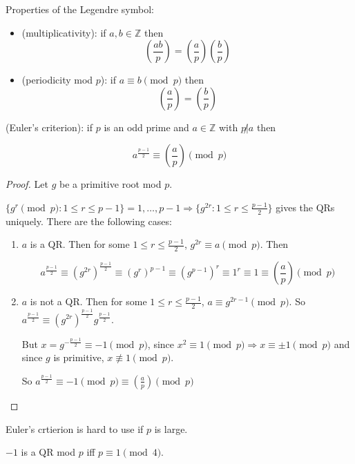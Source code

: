 Properties of the Legendre symbol:
\begin{itemize}
	\item (multiplicativity): if $a, b \in \mathbb{Z}$ then
	\[(\frac{ab}{p}) = (\frac{a}{p})(\frac{b}{p})\]
	\item (periodicity mod $p$): if $a \equiv b \pmod{p}$ then
	\[(\frac{a}{p}) = (\frac{b}{p})\]
\end{itemize}

\begin{theorem}
	(Euler's criterion): if $p$ is an odd prime and $a \in \mathbb{Z}$ with $p \not | a$ then

	\[a^{\frac{p - 1}{2}} \equiv (\frac{a}{p}) \pmod{p}\]
\end{theorem}

\begin{proof}
	Let $g$ be a primitive root mod $p$.
	
	$\{g^r \pmod{p}: 1 \le r \le p - 1\} = {1, \dots, p - 1} \Rightarrow \{g^{2r}: 1 \le r \le \frac{p - 1}{2}\}$ gives the QRs uniquely. There are the following cases:

	\begin{enumerate}
		\item $a$ is a QR. Then for some $1 \le r \le \frac{p - 1}{2}$, $g^{2r} \equiv a \pmod{p}$. Then
		
		\[a^{\frac{p - 1}{2}} \equiv (g^{2r})^{\frac{p - 1}{2}} \equiv (g^r)^{p - 1} \equiv (g^{p - 1})^r \equiv 1^r \equiv 1 \equiv (\frac{a}{p}) \pmod{p}\]
		\item $a$ is not a QR. Then for some $1 \le r \le \frac{p - 1}{2}$, $a \equiv g^{2r - 1} \pmod{p}$. So $a^{\frac{p - 1}{2}} \equiv (g^{2r})^{\frac{p - 1}{2}} g^{\frac{p - 1}{2}}$.
		
		But $x = g^{-\frac{p - 1}{2}} \equiv -1 \pmod{p}$, since $x^2 \equiv 1 \pmod{p} \Rightarrow x \equiv \pm 1 \pmod{p}$ and since $g$ is primitive, $x \not\equiv 1 \pmod{p}$.

		So $a^{\frac{p - 1}{2}} \equiv -1 \pmod{p} \equiv (\frac{a}{p}) \pmod{p}$
	\end{enumerate}
\end{proof}

\begin{remark}
	Euler's crtierion is hard to use if $p$ is large.
\end{remark}

\begin{corollary}
	$-1$ is a QR mod $p$ iff $p \equiv 1 \pmod{4}$.
\end{corollary}

